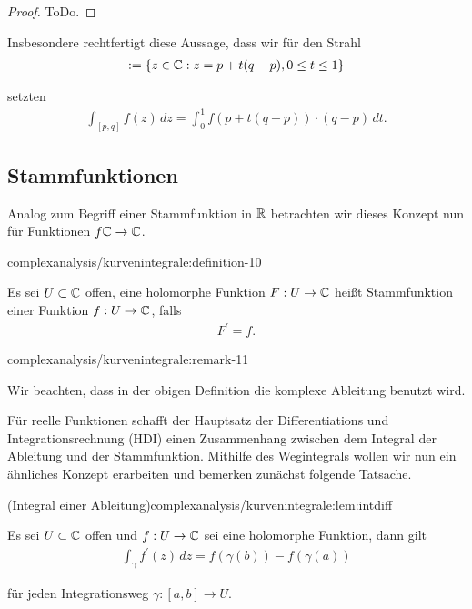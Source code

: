 \begin{proof}
 ToDo.
\end{proof}

\par
Insbesondere rechtfertigt diese Aussage, dass wir für den Strahl
\begin{align*}
[p,q]:=\{z\in\C: z = p+t(q-p), 0\leq t\leq 1\}
\end{align*}
\par
setzten
\begin{align*}
\int_{[p,q]} f(z)\, dz = \int_0^1 f(p+t(q-p))\cdot (q-p)\, dt.
\end{align*}

\subsection{Stammfunktionen}
\label{\detokenize{complexanalysis/kurvenintegrale:stammfunktionen}}
\par
Analog zum Begriff einer Stammfunktion in \(\mathbb{R}\) betrachten wir dieses Konzept nun für Funktionen \(f\mathbb{C}\to\mathbb{C}\).
\begin{definition}{}{complexanalysis/kurvenintegrale:definition-10}



\par
Es sei \(U\subset\mathbb{C}\) offen, eine holomorphe Funktion \(F:U\to\mathbb{C}\) heißt Stammfunktion einer Funktion \(f:U\to\mathbb{C}\), falls
\begin{align*}
F^\prime = f.
\end{align*}\end{definition}
\begin{remark}{}{complexanalysis/kurvenintegrale:remark-11}



\par
Wir beachten, dass in der obigen Definition die komplexe Ableitung benutzt wird.
\end{remark}

\par
Für reelle Funktionen schafft der Hauptsatz der Differentiations  und Integrationsrechnung (HDI) einen Zusammenhang zwischen dem Integral der Ableitung und der Stammfunktion. Mithilfe des Wegintegrals wollen wir nun ein ähnliches Konzept erarbeiten und bemerken zunächst folgende Tatsache.
\begin{lemma}{(Integral einer Ableitung)}{complexanalysis/kurvenintegrale:lem:intdiff}



\par
Es sei \(U\subset\mathbb{C}\) offen und \(f:U\to\mathbb{C}\) sei eine holomorphe Funktion, dann gilt
\begin{align*}
\int_\gamma f^\prime(z)\, dz= f(\gamma(b)) - f(\gamma(a))
\end{align*}
\par
für jeden Integrationsweg \(\gamma:[a,b]\to U\).
\end{lemma}

